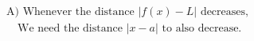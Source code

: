 \documentclass[preview]{standalone}
\begin{document}
\begin{align*}
\text{A) Whenever the distance } |f(x) - L| \text{ decreases,} \\
                             \quad \text{We need the distance } |x - a| \text{ to also decrease.}
\end{align*}
\end{document}
